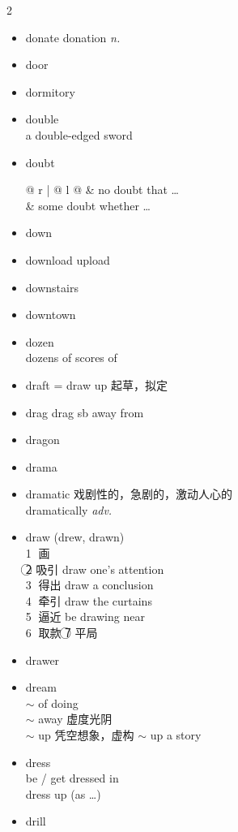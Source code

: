 \documentclass[../../book.tex]{subfiles}
\begin{document}
\begin{multicols}{2}
\begin{itemize}
\item[-] donate \phantom{a} donation \emph{n.}
\item[-] door
\item[-] dormitory
\item[-] double
\\a double-edged sword
\item[-] doubt
\\\begin{tabular}{@{} r | @{\hspace{0.1em}} l @{}}
 & no doubt that \ldots
\\& some doubt whether \ldots
\end{tabular}
\item[-] down
\item[-] download \phantom{a} upload
\item[-] downstairs
\item[-] downtown
\item[-] dozen
\\dozens of \phantom{a} scores of
\item[-] draft = draw up 起草，拟定
\item[-] drag \phantom{a} drag sb away from
\item[-] dragon
\item[-] drama
\item[-] dramatic \mbox{\small 戏剧性的，急剧的，激动人心的}
\\dramatically \emph{adv.}
\item[-] draw (drew, drawn)
\\\textcircled{1} 画
\\\textcircled{2} 吸引 draw one\textquoteright s attention
\\\textcircled{3} 得出 draw a conclusion
\\\textcircled{4} 牵引 draw the curtains
\\\textcircled{5} 逼近 be drawing near
\\\textcircled{6} 取款 \textcircled{7} 平局
\item[-] drawer
\item[-] dream
\\$\sim$ of doing
\\$\sim$ away 虚度光阴
\\$\sim$ up 凭空想象，虚构 $\sim$ up a story
\item[-] dress
\\be / get dressed in
\\dress up (as \ldots)
\item[-] drill

\end{itemize}
\end{multicols}
\end{document}
